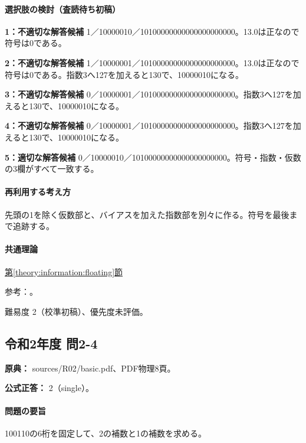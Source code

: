 \paragraph{選択肢の検討（査読待ち初稿）}

\noindent\textbf{1：不適切な解答候補} 1／10000010／10100000000000000000000。13.0は正なので符号は0である。\par

\noindent\textbf{2：不適切な解答候補} 1／10000001／10100000000000000000000。13.0は正なので符号は0である。指数3へ127を加えると130で、10000010になる。\par

\noindent\textbf{3：不適切な解答候補} 0／10000001／10100000000000000000000。指数3へ127を加えると130で、10000010になる。\par

\noindent\textbf{4：不適切な解答候補} 0／10000001／10100000000000000000000。指数3へ127を加えると130で、10000010になる。\par

\noindent\textbf{5：適切な解答候補} 0／10000010／10100000000000000000000。符号・指数・仮数の3欄がすべて一致する。\par

\paragraph{再利用する考え方} 先頭の1を除く仮数部と、バイアスを加えた指数部を別々に作る。符号を最後まで追跡する。

\paragraph{共通理論} \hyperref[theory:information:floating]{第\ref*{theory:information:floating}節}

\par 参考：\cite{oracle_single}。

\par 難易度 2（校準初稿）、優先度未評価。

\subsection{令和2年度 問2-4}
\label{q:r02-reg-basic-2-4}

\noindent\textbf{原典：} sources/R02/basic.pdf、PDF物理8頁。

\textbf{公式正答：} 2（single）。

\paragraph{問題の要旨} 100110の6桁を固定して、2の補数と1の補数を求める。

